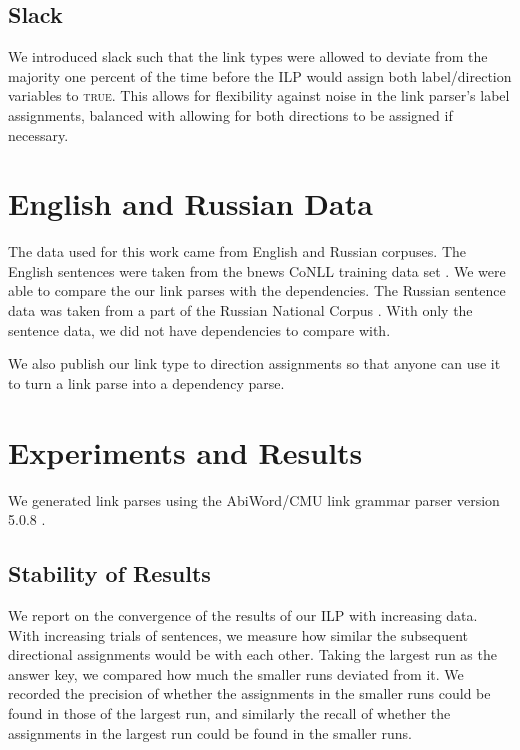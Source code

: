 \documentclass[11pt]{article}
\newcommand{\Note}[4][]{\todo[author=#2,color=#3,fancyline,#1]{#4}}
\newcommand{\noteJH}[2][]{\Note[#1]{JH}{blue!40}{#2}}
\begin{document}
\subsection{Slack}
We introduced slack such that the link types were allowed to deviate from the majority one percent of the time before the ILP would assign both label/direction variables to \textsc{true}. This allows for flexibility against noise in the link parser's label assignments, balanced with allowing for both directions to be assigned if necessary.


\section{English and Russian Data}
The data used for this work came from English and Russian corpuses. The English sentences were taken from the bnews CoNLL training data set \noteJH{cite}. We were able to compare the our link parses with the dependencies.
The Russian sentence data was taken from a part of the Russian National Corpus \noteJH{cite?}. With only the sentence data, we did not have dependencies to compare with.

We also publish our link type to direction assignments so that anyone can use it to turn a link parse into a dependency parse.

\section{Experiments and Results}
We generated link parses using the AbiWord/CMU link grammar parser version 5.0.8 \cite{LINKPARSER-2014}. 

\subsection{Stability of Results}
We report on the convergence of the results of our ILP with increasing data. With increasing trials of sentences, we measure how similar the subsequent directional assignments would be with each other. Taking the largest run as the answer key, we compared how much the smaller runs deviated from it. 
We recorded the precision of whether the assignments in the smaller runs could be found in those of the largest run, and similarly the recall of whether the assignments in the largest run could be found in the smaller runs. 
\end{document}
